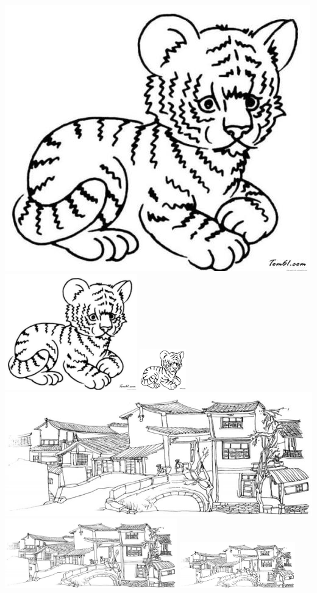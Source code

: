 \documentclass{ctexart}%
\begin{document}
	\includegraphics[scale=0.3]{lion}%
	\includegraphics[height=5cm]{lion}
	\includegraphics[width=2cm]{lion}\\
	\includegraphics[scale=0.3]{mountain}%
	\includegraphics[height=3cm]{mountain}
	\includegraphics[width=5cm]{mountain}\\
	
\end{document}
